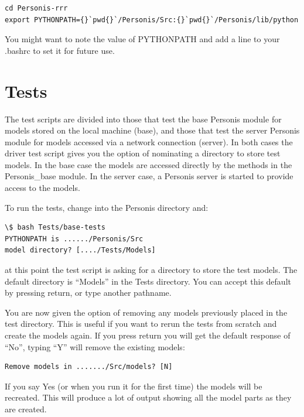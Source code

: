 \documentclass[letterpaper,10pt,english]{sphinxmanual}
\begin{document}
\begin{Verbatim}[commandchars=\\\{\}]
cd Personis-rrr
export PYTHONPATH={}`pwd{}`/Personis/Src:{}`pwd{}`/Personis/lib/python
\end{Verbatim}

You might want to note the value of PYTHONPATH and add a line to
your .bashrc to set it for future use.


\chapter{Tests}
\label{Tests:tests}\label{Tests::doc}
The test scripts are divided into those that test the base Personis
module for models stored on the local machine (base), and those that
test the server Personis module for models accessed via a network
connection (server). In both cases the driver test script gives you the
option of nominating a directory to store test models. In the base case
the models are accessed directly by the methods in the Personis\_base
module. In the server case, a Personis server is started to provide
access to the models.

To run the tests, change into the Personis directory and:

\begin{Verbatim}[commandchars=\\\{\}]
\$ bash Tests/base-tests
PYTHONPATH is ....../Personis/Src
model directory? [..../Tests/Models]
\end{Verbatim}

at this point the test script is asking for a directory to store the test models. The default directory
is ``Models'' in the Tests directory. You can accept this default by pressing return, or type another pathname.

You are now given the option of removing any models previously placed in the test directory. This is useful if
you want to rerun the tests from scratch and create the models again. If you press return you will get
the default response of ``No'', typing ``Y'' will remove the existing models:

\begin{Verbatim}[commandchars=\\\{\}]
Remove models in ......./Src/models? [N]
\end{Verbatim}

If you say Yes (or when you run it for the first time) the models will be recreated.
This will produce a lot of output showing all the model parts as they are created.
\end{document}

